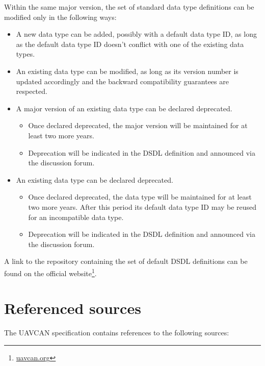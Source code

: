 Within the same major version, the set of standard data type definitions can be modified only in the following ways:

\begin{itemize}
    \item A new data type can be added, possibly with a default data type ID,
    as long as the default data type ID doesn't conflict with one of the existing data types.

    \item An existing data type can be modified, as long as its version number is updated accordingly
    and the backward compatibility guarantees are respected.

    \item A major version of an existing data type can be declared deprecated.
    \begin{itemize}
        \item Once declared deprecated, the major version will be maintained for at least two more years.
        \item Deprecation will be indicated in the DSDL definition and announced via the discussion forum.
    \end{itemize}

    \item An existing data type can be declared deprecated.
    \begin{itemize}
        \item Once declared deprecated, the data type will be maintained for at least two more years.
        After this period its default data type ID may be reused for an incompatible data type.
        \item Deprecation will be indicated in the DSDL definition and announced via the discussion forum.
    \end{itemize}
\end{itemize}

A link to the repository containing the set of default DSDL definitions can be found on the official
website\footnote{\href{http://uavcan.org}{uavcan.org}}.

\section{Referenced sources}

The UAVCAN specification contains references to the following sources:


